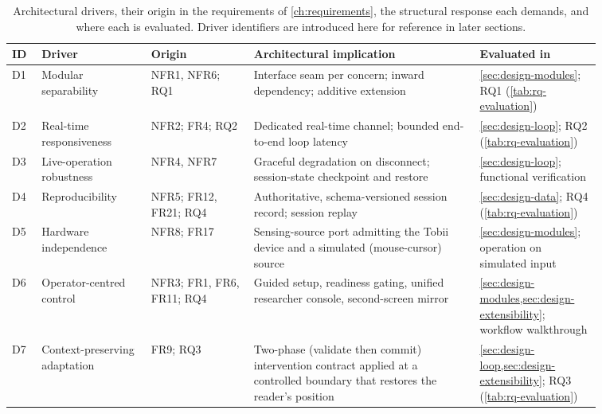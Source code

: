 \begin{table}[H]
\centering
\caption[Architectural drivers and where each is evaluated.]{Architectural drivers, their origin in the requirements of \cref{ch:requirements}, the structural response each demands, and where each is evaluated. Driver identifiers are introduced here for reference in later sections.}
\label{tab:design-drivers}
\small
\setlength{\tabcolsep}{4pt}
\renewcommand{\arraystretch}{1.1}
\begin{tabular}{%
  p{0.045\linewidth}
  p{0.165\linewidth}
  p{0.155\linewidth}
  p{0.33\linewidth}
  p{0.165\linewidth}
}
\toprule
\textbf{ID} & \textbf{Driver} & \textbf{Origin} & \textbf{Architectural implication} & \textbf{Evaluated in} \\
\midrule
D1 & Modular separability & NFR1, NFR6; RQ1 &
  Interface seam per concern; inward dependency; additive extension &
  \cref{sec:design-modules}; RQ1 (\cref{tab:rq-evaluation}) \\
\addlinespace
D2 & Real-time responsiveness & NFR2; FR4; RQ2 &
  Dedicated real-time channel; bounded end-to-end loop latency &
  \cref{sec:design-loop}; RQ2 (\cref{tab:rq-evaluation}) \\
\addlinespace
D3 & Live-operation robustness & NFR4, NFR7 &
  Graceful degradation on disconnect; session-state checkpoint and restore &
  \cref{sec:design-loop}; functional verification \\
\addlinespace
D4 & Reproducibility & NFR5; FR12, FR21; RQ4 &
  Authoritative, schema-versioned session record; session replay &
  \cref{sec:design-data}; RQ4 (\cref{tab:rq-evaluation}) \\
\addlinespace
D5 & Hardware independence & NFR8; FR17 &
  Sensing-source port admitting the Tobii device and a simulated (mouse-cursor) source &
  \cref{sec:design-modules}; operation on simulated input \\
\addlinespace
D6 & Operator-centred control & NFR3; FR1, FR6, FR11; RQ4 &
  Guided setup, readiness gating, unified researcher console, second-screen mirror &
  \cref{sec:design-modules,sec:design-extensibility}; workflow walkthrough \\
\addlinespace
D7 & Context-preserving adaptation & FR9; RQ3 &
  Two-phase (validate then commit) intervention contract applied at a controlled boundary that restores the reader's position &
  \cref{sec:design-loop,sec:design-extensibility}; RQ3 (\cref{tab:rq-evaluation}) \\
\bottomrule
\end{tabular}
\end{table}
